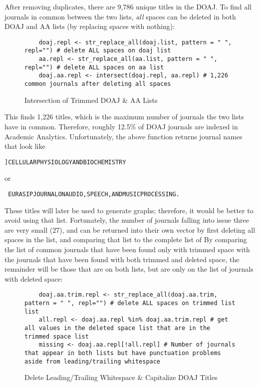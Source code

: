 \documentclass{article}
\begin{document}
After removing duplicates, there are 9,786 unique titles in the DOAJ.
To find all journals in common between the two lists, \textit{all } spaces can be deleted in both DOAJ and AA  lists (by replacing spaces with nothing):
\begin{figure}
	\centering
	\begin{lstlisting}
	doaj.repl <- str_replace_all(doaj.list, pattern = " ", repl="") # delete ALL spaces on doaj list
	aa.repl <- str_replace_all(aa.list, pattern = " ", repl="") # delete ALL spaces on aa list
	doaj.aa.repl <- intersect(doaj.repl, aa.repl) # 1,226 common journals after deleting all spaces
	\end{lstlisting}
	\caption{Intersection of Trimmed DOAJ \& AA Lists}
\end{figure}
This finds 1,226 titles, which is the maximum number of journals the two lists have in common.
Therefore, roughly 12.5\% of DOAJ journals are indexed in Academic Analytics.
Unfortunately, the above function returns journal names that look like \begin{verbatim}]CELLULARPHYSIOLOGYANDBIOCHEMISTRY \end{verbatim} or \begin{verbatim} EURASIPJOURNALONAUDIO,SPEECH,ANDMUSICPROCESSING. \end{verbatim}
These titles will later be used to generate graphs; therefore, it would be better to avoid using that list.
Fortunately, the number of journals falling into issue three are very small (27), and can be returned into their own vector by first deleting all spaces in the list, and comparing that list to the complete list of 
By comparing the list of common journals that have been found only with trimmed space with the journals that have been found with both trimmed and deleted space, the remainder will be those that are on both lists, but are only on the list of journals with deleted space:
\begin{figure}
	\centering
	\begin{lstlisting}
	doaj.aa.trim.repl <- str_replace_all(doaj.aa.trim, pattern = " ", repl="") # delete ALL spaces on trimmed list list
	all.repl <- doaj.aa.repl %in% doaj.aa.trim.repl # get all values in the deleted space list that are in the trimmed space list
	missing <- doaj.aa.repl[!all.repl] # Number of journals that appear in both lists but have punctuation problems aside from leading/trailing whitespace
	\end{lstlisting}
	\caption{Delete Leading/Trailing Whitespace \& Capitalize DOAJ Titles}
\end{figure}
\end{document}
